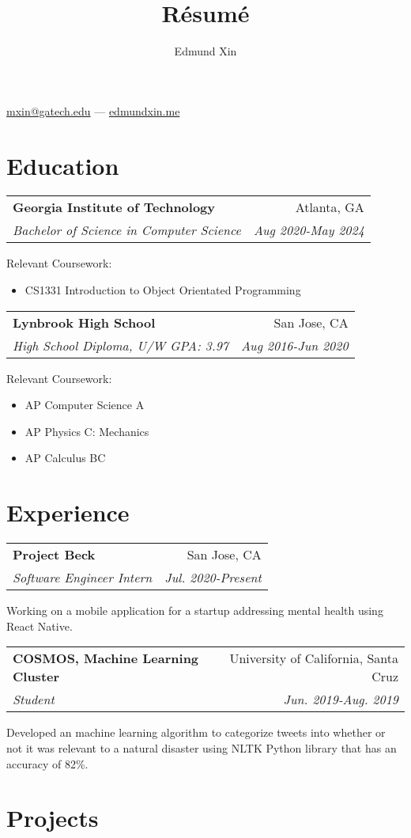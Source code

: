 \documentclass[letterpaper,11pt]{article}
\makeatletter
\renewcommand{\maketitle}{
  \begin{center}
  {\huge\bfseries
  \theauthor}

  \vspace{0.25em}

  \href{mailto:mxin@gatech.edu}{mxin@gatech.edu} --- \href{https://edmundxin.me}{edmundxin.me}

  \end{center}
}
\newcommand{\resumeSubheading}[4]{
  \vspace{0.25em}
  \begin{tabular*}{0.97\textwidth}[t]{l@{\extracolsep{\fill}}r}
    \textbf{#1} & #2 \\
    \textit{\small#3} & \textit{\small #4} \\
  \end{tabular*}\vspace{0.25em}
}
\makeatother
\begin{document}
\title{R\'esum\'e}
\author{Edmund Xin}

\maketitle

\section{Education}

\resumeSubheading{Georgia Institute of Technology}
{Atlanta, GA}{Bachelor of Science in Computer Science
}{Aug 2020-May 2024}
Relevant Coursework:
\begin{itemize}[label=\raisebox{0.25ex}{\tiny$\bullet$}]
  \item CS1331 Introduction to Object Orientated Programming
\end{itemize}


\resumeSubheading{Lynbrook High School}
{San Jose, CA}{High School Diploma, U/W GPA: 3.97}{Aug 2016-Jun 2020}
Relevant Coursework:
\begin{itemize}[label=\raisebox{0.25ex}{\tiny$\bullet$}]
  \item AP Computer Science A
  \item AP Physics C: Mechanics
  \item AP Calculus BC
\end{itemize}


\section{Experience}

\resumeSubheading{Project Beck}{San Jose, CA}{Software Engineer Intern}{Jul. 2020-Present}

Working on a mobile application for a startup addressing mental health using React Native.

\resumeSubheading{COSMOS, Machine Learning Cluster}
{University of California, Santa Cruz}{Student}{Jun. 2019-Aug. 2019}

Developed an machine learning algorithm to categorize tweets into whether or not it was relevant to a natural disaster using NLTK Python library that has an accuracy of 82\%.

\section{Projects}
\end{document}
